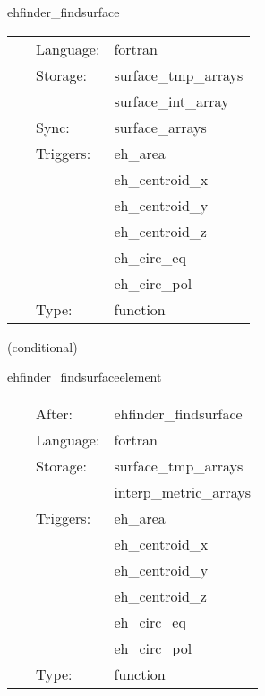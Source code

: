 \hspace{5mm} ehfinder\_findsurface 

\hspace{5mm}{\it find surface } 


\hspace{5mm}

 \begin{tabular*}{160mm}{cll} 
~ & Language:  & fortran \\ 
~ & Storage:  & surface\_tmp\_arrays \\ 
~& ~ &surface\_int\_array\\ 
~ & Sync:  & surface\_arrays \\ 
~ & Triggers:  & eh\_area \\ 
~& ~ &eh\_centroid\_x\\ 
~& ~ &eh\_centroid\_y\\ 
~& ~ &eh\_centroid\_z\\ 
~& ~ &eh\_circ\_eq\\ 
~& ~ &eh\_circ\_pol\\ 
~ & Type:  & function \\ 
\end{tabular*} 


\vspace{5mm}

   (conditional) 

\hspace{5mm} ehfinder\_findsurfaceelement 

\hspace{5mm}{\it find surface area element } 


\hspace{5mm}

 \begin{tabular*}{160mm}{cll} 
~ & After:  & ehfinder\_findsurface \\ 
~ & Language:  & fortran \\ 
~ & Storage:  & surface\_tmp\_arrays \\ 
~& ~ &interp\_metric\_arrays\\ 
~ & Triggers:  & eh\_area \\ 
~& ~ &eh\_centroid\_x\\ 
~& ~ &eh\_centroid\_y\\ 
~& ~ &eh\_centroid\_z\\ 
~& ~ &eh\_circ\_eq\\ 
~& ~ &eh\_circ\_pol\\ 
~ & Type:  & function \\ 
\end{tabular*} 


